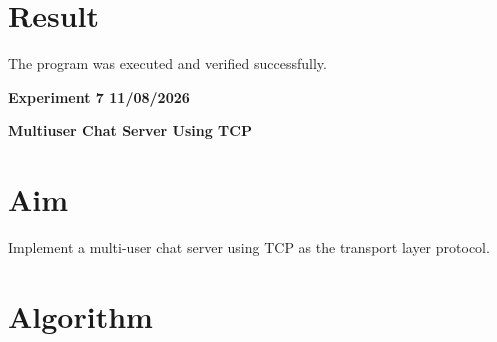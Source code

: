 \documentclass[12pt, a4paper]{report}
\begin{document}
\section*{Result}

The program was executed and verified successfully.

\newpage 
\begin{center}
	\bfseries 
	Experiment 7 \hfill 11/08/2026
\end{center}

\label{exp:7}
\begin{center}
	{\bfseries \Huge Multiuser Chat Server Using TCP \par}
\end{center}

\section*{Aim}

Implement a multi-user chat server using TCP as the transport layer protocol.

\section*{Algorithm}
\end{document}
